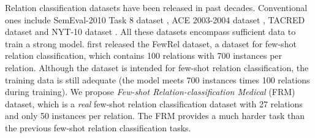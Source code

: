 Relation classification datasets have been released in past decades. Conventional ones include SemEval-2010 Task 8 dataset \citep{semeval8}, ACE 2003-2004 dataset \citep{ace}, TACRED dataset \citep{zhang-etal-2017-position} and NYT-10 dataset \citep{NYTdataset}. All these datasets encompass sufficient data to train a strong model. \citet{han-etal-2018-fewrel} first released the FewRel dataset, a dataset for few-shot relation classification, which contains 100 relations with 700 instances per relation. Although the dataset is intended for few-shot relation classification, the training data is still adequate (the model meets 700 instances times 100 relations during training). %
We propose \emph{Few-shot Relation-classification Medical} (FRM) dataset, which is a \emph{real} few-shot relation classification dataset with 27 relations and only 50 instances per relation. The FRM provides a much harder task than the previous few-shot relation classification tasks. %
